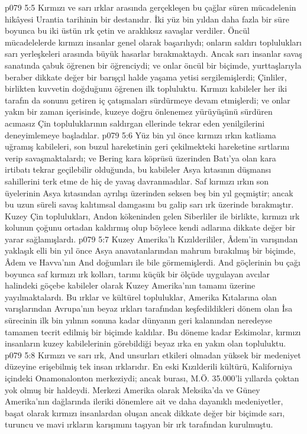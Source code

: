 \vs p079 5:5 Kırmızı ve sarı ırklar arasında gerçekleşen bu çağlar süren mücadelenin hikâyesi Urantia tarihinin bir destanıdır. İki yüz bin yıldan daha fazla bir süre boyunca bu iki üstün ırk çetin ve araklıksız savaşlar verdiler. Öncül mücadelelerde kırmızı insanlar genel olarak başarılıydı; onların saldırı toplulukları sarı yerleşkeleri arasında büyük hasarlar bırakmaktaydı. Ancak sarı insanlar savaş sanatında çabuk öğrenen bir öğrenciydi; ve onlar öncül bir biçimde, yurttaşlarıyla beraber dikkate değer bir barışçıl halde yaşama yetisi sergilemişlerdi; Çinliler, birlikten kuvvetin doğduğunu öğrenen ilk topluluktu. Kırmızı kabileler her iki tarafın da sonunu getiren iç çatışmaları sürdürmeye devam etmişlerdi; ve onlar yakın bir zaman içerisinde, kuzeye doğru önlenemez yürüyüşünü sürdüren acımasız Çin topluluklarının saldırgan ellerinde tekrar eden yenilgilerini deneyimlemeye başladılar.
\vs p079 5:6 Yüz bin yıl önce kırmızı ırkın katliama uğramış kabileleri, son buzul hareketinin geri çekilmekteki hareketine sırtlarını verip savaşmaktalardı; ve Bering kara köprüsü üzerinden Batı’ya olan kara irtibatı tekrar geçilebilir olduğunda, bu kabileler Asya kıtasının düşmansı sahillerini terk etme de hiç de yavaş davranmadılar. Saf kırmızı ırkın son üyelerinin Asya kıtasından ayrılışı üzerinden seksen beş bin yıl geçmiştir; ancak bu uzun süreli savaş kalıtımsal damgasını bu galip sarı ırk üzerinde bırakmıştır. Kuzey Çin toplulukları, Andon kökeninden gelen Siberliler ile birlikte, kırmızı ırk kolunun çoğunu ortadan kaldırmış olup böylece kendi adlarına dikkate değer bir yarar sağlamışlardı.
\vs p079 5:7 Kuzey Amerika’lı Kızılderililer, Âdem’in varışından yaklaşık elli bin yıl önce Asya anavatanlarından mahrum bırakılmış bir biçimde, Âdem ve Havva’nın And doğumları ile bile görmemişlerdi. And göçlerinin bu çağı boyunca saf kırmızı ırk kolları, tarımı küçük bir ölçüde uygulayan avcılar halindeki göçebe kabileler olarak Kuzey Amerika’nın tamamı üzerine yayılmaktalardı. Bu ırklar ve kültürel topluluklar, Amerika Kıtalarına olan varışlarından Avrupa’nın beyaz ırkları tarafından keşfedildikleri dönem olan İsa sürecinin ilk bin yılının sonuna kadar dünyanın geri kalanından neredeyse tamamen tecrit edilmiş bir biçimde kaldılar. Bu döneme kadar Eskimolar, kırmızı insanların kuzey kabilelerinin görebildiği beyaz ırka en yakın olan topluluktu.
\vs p079 5:8 Kırmızı ve sarı ırk, And unsurları etkileri olmadan yüksek bir medeniyet düzeyine erişebilmiş tek insan ırklarıdır. En eski Kızılderili kültürü, Kaliforniya içindeki Onamonalonton merkeziydi; ancak burası, M.Ö. 35.000’li yıllarda çoktan yok olmuş bir haldeydi. Merkezi Amerika olarak Meksika’da ve Güney Amerika’nın dağlarında ileriki dönemlere ait ve daha dayanıklı medeniyetler, başat olarak kırmızı insanlardan oluşan ancak dikkate değer bir biçimde sarı, turuncu ve mavi ırkların karışımını taşıyan bir ırk tarafından kurulmuştu.
